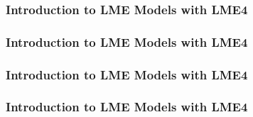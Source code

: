 \begin{frame}[fragile]
\frametitle{Introduction to LME Models with LME4} 
\Large

\end{frame}
\begin{frame}[fragile]
\frametitle{Introduction to LME Models with LME4} 
\Large


\end{frame}
\begin{frame}[fragile]
\frametitle{Introduction to LME Models with LME4} 
\Large


\end{frame}
\begin{frame}[fragile]
\frametitle{Introduction to LME Models with LME4} 
\Large






\end{frame}










